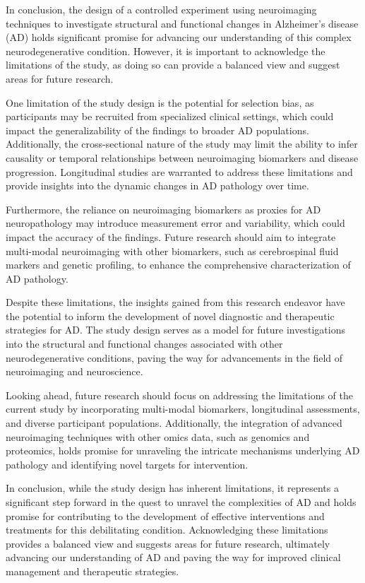 \documentclass[10pt]{article}
\begin{document}
\begin{sloppypar}
  In conclusion, the design of a controlled experiment using neuroimaging techniques to investigate structural and functional changes in Alzheimer's disease (AD) holds significant promise for advancing our understanding of this complex neurodegenerative condition. However, it is important to acknowledge the limitations of the study, as doing so can provide a balanced view and suggest areas for future research.

  One limitation of the study design is the potential for selection bias, as participants may be recruited from specialized clinical settings, which could impact the generalizability of the findings to broader AD populations. Additionally, the cross-sectional nature of the study may limit the ability to infer causality or temporal relationships between neuroimaging biomarkers and disease progression. Longitudinal studies are warranted to address these limitations and provide insights into the dynamic changes in AD pathology over time.

  Furthermore, the reliance on neuroimaging biomarkers as proxies for AD neuropathology may introduce measurement error and variability, which could impact the accuracy of the findings. Future research should aim to integrate multi-modal neuroimaging with other biomarkers, such as cerebrospinal fluid markers and genetic profiling, to enhance the comprehensive characterization of AD pathology.

  Despite these limitations, the insights gained from this research endeavor have the potential to inform the development of novel diagnostic and therapeutic strategies for AD. The study design serves as a model for future investigations into the structural and functional changes associated with other neurodegenerative conditions, paving the way for advancements in the field of neuroimaging and neuroscience.

  Looking ahead, future research should focus on addressing the limitations of the current study by incorporating multi-modal biomarkers, longitudinal assessments, and diverse participant populations. Additionally, the integration of advanced neuroimaging techniques with other omics data, such as genomics and proteomics, holds promise for unraveling the intricate mechanisms underlying AD pathology and identifying novel targets for intervention.

  In conclusion, while the study design has inherent limitations, it represents a significant step forward in the quest to unravel the complexities of AD and holds promise for contributing to the development of effective interventions and treatments for this debilitating condition. Acknowledging these limitations provides a balanced view and suggests areas for future research, ultimately advancing our understanding of AD and paving the way for improved clinical management and therapeutic strategies.

  \pagebreak
  \singlespacing %
  
  

\end{sloppypar}
\end{document}
